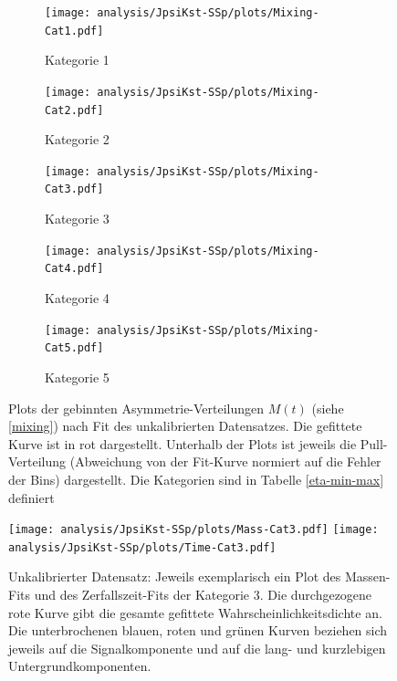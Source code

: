 \begin{figure}
        \centering
        \begin{subfigure}[b]{0.49\textwidth}
                \centering
                \texttt{[image: analysis/JpsiKst-SSp/plots/Mixing-Cat1.pdf]}
                \caption{Kategorie 1}
        \end{subfigure}
        \begin{subfigure}[b]{0.49\textwidth}
                \centering
                \texttt{[image: analysis/JpsiKst-SSp/plots/Mixing-Cat2.pdf]}
                \caption{Kategorie 2}
        \end{subfigure}

        \begin{subfigure}[b]{0.49\textwidth}
                \centering
                \texttt{[image: analysis/JpsiKst-SSp/plots/Mixing-Cat3.pdf]}
                \caption{Kategorie 3}
        \end{subfigure}
        \begin{subfigure}[b]{0.49\textwidth}
                \centering
                \texttt{[image: analysis/JpsiKst-SSp/plots/Mixing-Cat4.pdf]}
                \caption{Kategorie 4}
        \end{subfigure}

        \begin{subfigure}[b]{0.49\textwidth}
                \centering
                \texttt{[image: analysis/JpsiKst-SSp/plots/Mixing-Cat5.pdf]}
                \caption{Kategorie 5}
        \end{subfigure}
        \caption{Plots der gebinnten Asymmetrie-Verteilungen $M(t)$ (siehe \eqref{mixing}) nach Fit des unkalibrierten Datensatzes. Die gefittete Kurve ist in rot dargestellt. Unterhalb der Plots ist jeweils die Pull-Verteilung (Abweichung von der Fit-Kurve normiert auf die Fehler der Bins) dargestellt. Die Kategorien sind in Tabelle \ref{eta-min-max} definiert}
        \label{mixing-fit}
\end{figure}

\begin{figure}
  \texttt{[image: analysis/JpsiKst-SSp/plots/Mass-Cat3.pdf]}
  \texttt{[image: analysis/JpsiKst-SSp/plots/Time-Cat3.pdf]}
  \caption{Unkalibrierter Datensatz: Jeweils exemplarisch ein Plot des Massen-Fits und des Zerfallszeit-Fits der Kategorie 3. Die durchgezogene rote Kurve gibt die gesamte gefittete Wahrscheinlichkeitsdichte an. Die unterbrochenen blauen, roten und grünen Kurven beziehen sich jeweils auf die Signalkomponente und auf die lang- und kurzlebigen Untergrundkomponenten.}
  \label{fit-examples}
\end{figure}

